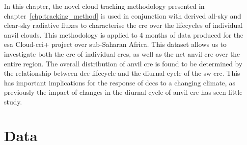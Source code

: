 
In this chapter, the novel cloud tracking methodology presented in chapter~\ref{chp:tracking_method} is used in conjunction with derived all-sky and clear-sky radiative fluxes to characterise the \acrshort{cre} over the lifecycles of individual anvil clouds. 
This methodology is applied to 4 months of data produced for the \acrshort{esa} Cloud-\acrfull{cci}+ project over sub-Saharan Africa. 
This dataset allows us to investigate both the \acrshort{cre} of individual \acrshort{cre}s, as well as the net anvil \acrshort{cre} over the entire region. 
The overall distribution of anvil \acrshort{cre} is found to be determined by the relationship between \acrshort{dcc} lifecycle and the diurnal cycle of the \acrshort{sw} \acrshort{cre}.
This has important implications for the response of \acrshort{dcc}s to a changing climate, as previously the impact of changes in the diurnal cycle of anvil \acrshort{cre} has seen little study.



\section{Data}


